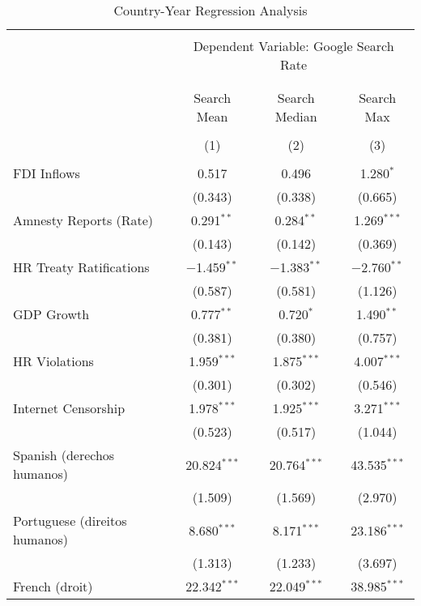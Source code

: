 
\begin{table}[!htbp] \centering 
  \caption{Country-Year Regression Analysis} 
  \label{} 
\begin{tabular}{@{\extracolsep{5pt}}lccc} 
\\[-1.8ex]\hline 
\hline \\[-1.8ex] 
 & \multicolumn{3}{c}{Dependent Variable: Google Search Rate} \\ 
\cline{2-4} 
\\[-1.8ex] & \multicolumn{3}{c}{ } \\ 
 & Search Mean & Search Median & Search Max \\ 
\\[-1.8ex] & (1) & (2) & (3)\\ 
\hline \\[-1.8ex] 
 FDI Inflows & 0.517 & 0.496 & 1.280$^{*}$ \\ 
  & (0.343) & (0.338) & (0.665) \\ 
  Amnesty Reports (Rate) & 0.291$^{**}$ & 0.284$^{**}$ & 1.269$^{***}$ \\ 
  & (0.143) & (0.142) & (0.369) \\ 
  HR Treaty Ratifications & $-$1.459$^{**}$ & $-$1.383$^{**}$ & $-$2.760$^{**}$ \\ 
  & (0.587) & (0.581) & (1.126) \\ 
  GDP Growth & 0.777$^{**}$ & 0.720$^{*}$ & 1.490$^{**}$ \\ 
  & (0.381) & (0.380) & (0.757) \\ 
  HR Violations & 1.959$^{***}$ & 1.875$^{***}$ & 4.007$^{***}$ \\ 
  & (0.301) & (0.302) & (0.546) \\ 
  Internet Censorship & 1.978$^{***}$ & 1.925$^{***}$ & 3.271$^{***}$ \\ 
  & (0.523) & (0.517) & (1.044) \\ 
  Spanish (derechos humanos) & 20.824$^{***}$ & 20.764$^{***}$ & 43.535$^{***}$ \\ 
  & (1.509) & (1.569) & (2.970) \\ 
  Portuguese (direitos humanos) & 8.680$^{***}$ & 8.171$^{***}$ & 23.186$^{***}$ \\ 
  & (1.313) & (1.233) & (3.697) \\ 
  French (droit) & 22.342$^{***}$ & 22.049$^{***}$ & 38.985$^{***}$ \\ 

\end{tabular}
\end{table}
